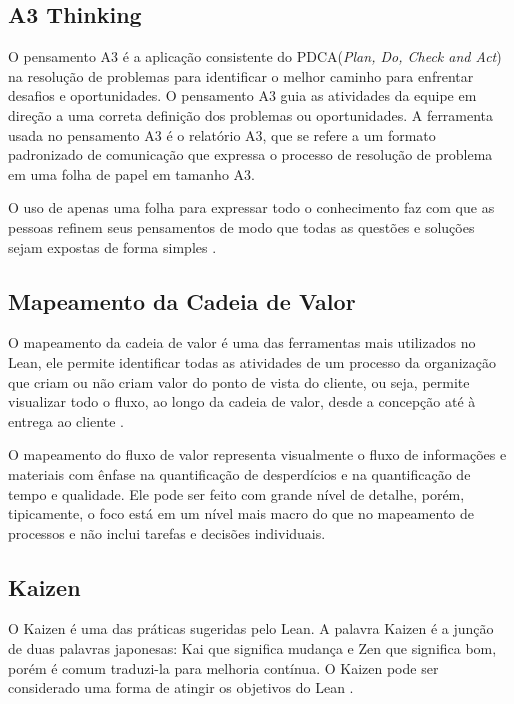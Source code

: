 \begin{anexosenv}
\subsection[A3 Thinking]{A3 Thinking}

O pensamento A3 é a aplicação consistente do PDCA(\textit{Plan, Do, Check and Act}) na resolução de problemas para identificar o melhor caminho para enfrentar desafios e oportunidades. O pensamento A3 guia as atividades da equipe em direção a uma correta definição dos problemas ou oportunidades. A ferramenta usada no pensamento A3 é o relatório A3, que se refere a um formato padronizado de comunicação que expressa o processo de resolução de problema em uma folha de papel em tamanho A3.

O uso de apenas uma folha para expressar todo o conhecimento faz com que as pessoas refinem seus pensamentos de modo que todas as questões e soluções sejam expostas de forma simples \cite{liker}. 

\subsection[Mapeamento da Cadeia de Valor]{Mapeamento da Cadeia de Valor}

O mapeamento da cadeia de valor é uma das ferramentas mais utilizados no Lean, ele permite identificar todas as atividades de um processo da organização que criam ou não criam valor do ponto de vista do cliente, ou seja, permite visualizar todo o fluxo, ao longo da cadeia de valor, desde a concepção até à entrega ao cliente \cite{bell2011}.

O mapeamento do fluxo de valor representa visualmente o fluxo de informações e materiais com ênfase na quantificação de desperdícios e na quantificação de tempo e qualidade. Ele pode ser feito com grande nível de detalhe, porém, tipicamente, o foco está em um nível mais macro do que no mapeamento de processos  e não inclui tarefas e decisões individuais.

\subsection[Kaizen]{Kaizen}

O Kaizen é uma das práticas sugeridas pelo Lean. A palavra Kaizen é a junção de duas palavras japonesas: Kai que significa mudança e Zen que significa bom, porém é comum traduzi-la para melhoria contínua. O Kaizen  pode ser considerado uma forma de atingir os objetivos do Lean \cite{bell2011}.


\end{anexosenv}
